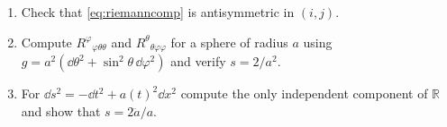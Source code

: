 \begin{exercises}
\begin{enumerate}[nosep]
\item Check that \eqref{eq:riemanncomp} is antisymmetric in $(i,j)$.
\item Compute $R^\varphi{}_{\varphi\theta\theta}$ and $R^\theta{}_{\theta\varphi\varphi}$ for a sphere of radius $a$ using $g=a^2(\dd\theta^2+\sin^2\theta\,\dd\varphi^2)$ and verify $s=2/a^2$.
\item For $\dd s^2=-\dd t^2+a(t)^2\dd x^2$ compute the only independent component of $\mathbb R$ and show that $s=2\ddot a/a$.
\end{enumerate}
\end{exercises}

